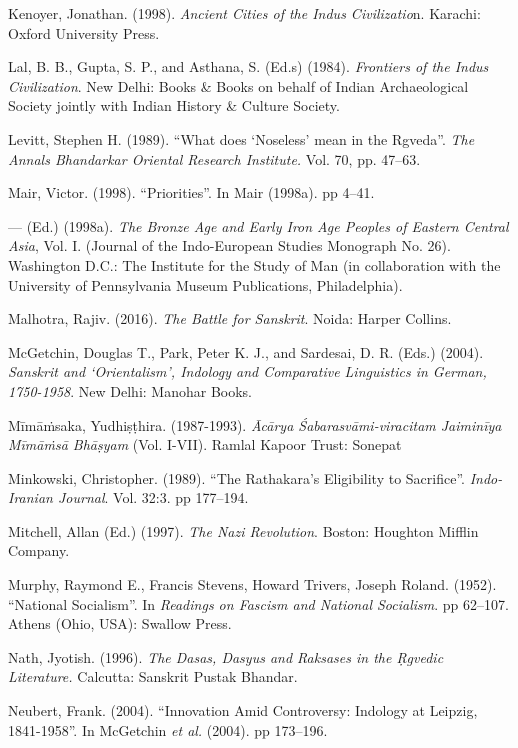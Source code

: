 \begin{thebibliography}{99}
  Kenoyer, Jonathan. (1998). \textit{Ancient Cities of the Indus Civilizatio}n. Karachi: Oxford University Press.

  Lal, B. B., Gupta, S. P., and Asthana, S. (Ed.s) (1984).\textit{ Frontiers of the Indus Civilization}. New Delhi: Books \& Books on behalf of Indian Archaeological Society jointly with Indian History \& Culture Society.

  Levitt, Stephen H. (1989). “What does ‘Noseless’ mean in the Rgveda”. \textit{The Annals Bhandarkar Oriental Research Institute.} Vol. 70, pp. 47--63.

  Mair, Victor. (1998). “Priorities”. In Mair (1998a). pp 4--41.

  — (Ed.) (1998a). \textit{The Bronze Age and Early Iron Age Peoples of Eastern Central Asia}, Vol. I. (Journal of the Indo-European Studies Monograph No. 26). Washington D.C.: The Institute for the Study of Man (in collaboration with the University of Pennsylvania Museum Publications, Philadelphia).

  Malhotra, Rajiv. (2016). \textit{The Battle for Sanskrit}. Noida: Harper Collins.

  McGetchin, Douglas T., Park, Peter K. J., and Sardesai, D. R. (Eds.) (2004). \textit{Sanskrit and ‘Orientalism’, Indology and Comparative Linguistics in German, 1750-1958}. New Delhi: Manohar Books.

  Mīmāṁsaka, Yudhiṣṭhira. (1987-1993). \textit{Ācārya Śabarasvāmi-viracitam Jaiminīya Mīmāṁsā Bhāṣyam} (Vol. I-VII). Ramlal Kapoor Trust: Sonepat

  Minkowski, Christopher. (1989). “The Rathakara’s Eligibility to Sacrifice”. \textit{Indo-Iranian Journal}. Vol. 32:3. pp 177--194.

  Mitchell, Allan (Ed.) (1997). \textit{The Nazi Revolution}. Boston: Houghton Mifflin Company.

  Murphy, Raymond E., Francis Stevens, Howard Trivers, Joseph Roland. (1952). “National Socialism”. In \textit{Readings on Fascism and National Socialism}. pp 62--107. Athens (Ohio, USA): Swallow Press.

  Nath, Jyotish. (1996). \textit{The Dasas, Dasyus and Raksases in the Ṛgvedic Literature.} Calcutta: Sanskrit Pustak Bhandar.

  Neubert, Frank. (2004). “Innovation Amid Controversy: Indology at Leipzig, 1841-1958”. In McGetchin \textit{et al.} (2004). pp 173--196.


\end{thebibliography}
